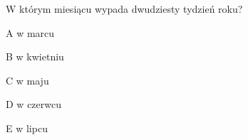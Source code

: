 \begin{tresc}
W którym miesiącu wypada dwudziesty tydzień roku?
\end{tresc}
\begin{wariant}{A} w marcu \end{wariant}
\begin{wariant}{B} w kwietniu \end{wariant}
\begin{wariant}{C} w maju \end{wariant}
\begin{wariant}{D} w czerwcu \end{wariant}
\begin{wariant}{E} w lipcu \end{wariant}
